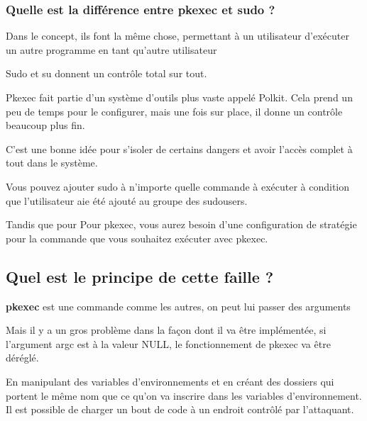 \documentclass[12pt,a4paper]{article}
\begin{document}
\begin{flushleft}
\begin{flushleft}
                \subsubsection{Quelle est la différence entre pkexec et sudo ?}
                \begin{flushleft}
                    \noindent Dans le concept, ils font la même chose, permettant à un utilisateur d'exécuter un autre programme en tant qu'autre utilisateur
                    \item Sudo et su donnent un contrôle total sur tout.
                    \item Pkexec fait partie d'un système d'outils plus vaste appelé Polkit. Cela prend un peu de temps pour le configurer, mais une fois sur place, il donne un contrôle beaucoup plus fin.
                    \item C'est une bonne idée pour s'isoler de certains dangers et avoir l'accès complet à tout dans le système.
                    \item Vous pouvez ajouter sudo à n’importe quelle commande à exécuter à condition que l'utilisateur aie été ajouté au groupe des sudousers.
                    \item Tandis que pour Pour pkexec, vous aurez besoin d’une configuration de stratégie pour la commande que vous souhaitez exécuter avec pkexec.
                \end{flushleft}
            \end{flushleft}
   		\end{flushleft}
   		\subsection{Quel est le principe de cette faille ?}
   		\begin{flushleft}
   			\noindent \textbf{pkexec} est une commande comme les autres, on peut lui passer des arguments
   			\item Mais il y a un gros problème dans la façon dont il va être implémentée, si l'argument argc est à la valeur NULL, le fonctionnement de pkexec va être déréglé. 
   			\item En manipulant des variables d'environnements et en créant des dossiers qui portent le même nom que ce qu'on va inscrire dans les variables d'environnement. Il est possible de charger un bout de code à un endroit contrôlé par l'attaquant. 
   		\end{flushleft}
   		
\end{document}
